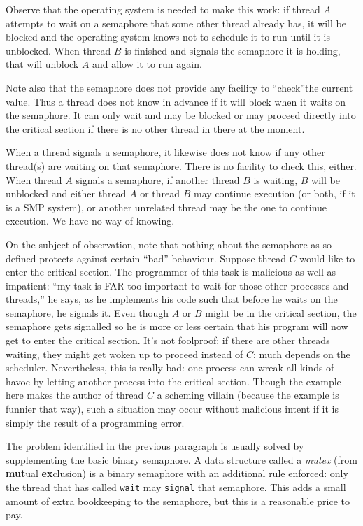 Observe that the operating system is needed to make this work: if thread $A$ attempts to wait on a semaphore that some other thread already has, it will be blocked and the operating system knows not to schedule it to run until it is unblocked. When thread $B$ is finished and signals the semaphore it is holding, that will unblock $A$ and allow it to run again.

Note also that the semaphore does not provide any facility to ``check''the current value. Thus a thread does not know in advance if it will block when it waits on the semaphore. It can only wait and may be blocked or may proceed directly into the critical section if there is no other thread in there at the moment.

When a thread signals a semaphore, it likewise does not know if any other thread(s) are waiting on that semaphore. There is no facility to check this, either. When thread $A$ signals a semaphore, if another thread $B$ is waiting, $B$ will be unblocked and either thread $A$ or thread $B$ may continue execution (or both, if it is a SMP system), or another unrelated thread may be the one to continue execution. We have no way of knowing.

On the subject of observation, note that nothing about the semaphore as so defined protects against certain ``bad'' behaviour. Suppose thread $C$ would like to enter the critical section. The programmer of this task is malicious as well as impatient: ``my task is FAR too important to wait for those other processes and threads,'' he says, as he implements his code such that before he waits on the semaphore, he signals it. Even though $A$ or $B$ might be in the critical section, the semaphore gets signalled so he is more or less certain that his program will now get to enter the critical section. It's not foolproof: if there are other threads waiting, they might get woken up to proceed instead of $C$; much depends on the scheduler. Nevertheless, this is really bad: one process can wreak all kinds of havoc by letting another process into the critical section. Though the example here makes the author of thread $C$ a scheming villain (because the example is funnier that way), such a situation may occur without malicious intent if it is simply the result of a programming error.

The problem identified in the previous paragraph is usually solved by supplementing the basic binary semaphore. A data structure called a \textit{mutex} (from \textbf{mut}ual \textbf{ex}clusion) is a binary semaphore with an additional rule enforced: only the thread that has called \texttt{wait} may \texttt{signal} that semaphore. This adds a small amount of extra bookkeeping to the semaphore, but this is a reasonable price to pay.

